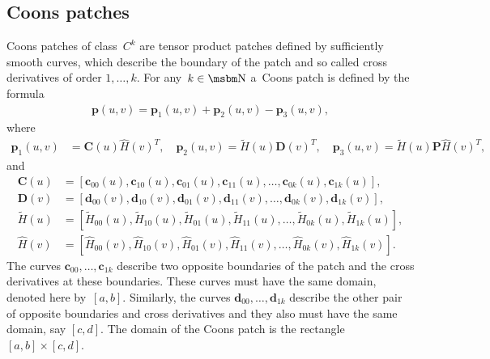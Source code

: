 \subsection{\label{ssect:Coons:patch:def}Coons patches}

Coons patches of class~$C^k$ are tensor product patches defined by
sufficiently smooth curves, which describe the boundary of the patch and
so called cross derivatives of order $1,\ldots,k$. For any~$k\in\N$ a~Coons
patch is defined by the formula
\begin{align}\label{eq:Coons:patch:def}
  \bm{p}(u,v) = \bm{p}_1(u,v)+\bm{p}_2(u,v)-\bm{p}_3(u,v),
\end{align}
where
\begin{align*}
  \bm{p}_1(u,v) &{}= \bm{C}(u)\hat{H}(v)^T, \quad
  \bm{p}_2(u,v) = \tilde{H}(u)\bm{D}(v)^T, \quad
  \bm{p}_3(u,v) = \tilde{H}(u)\bm{P}\hat{H}(v)^T,
\end{align*}
and
\begin{align*}
  \bm{C}(u) &{}= [\bm{c}_{00}(u),\bm{c}_{10}(u),\bm{c}_{01}(u),\bm{c}_{11}(u),
               \ldots,\bm{c}_{0k}(u),\bm{c}_{1k}(u)], \\
  \bm{D}(v) &{}= [\bm{d}_{00}(v),\bm{d}_{10}(v),\bm{d}_{01}(v),\bm{d}_{11}(v),
               \ldots,\bm{d}_{0k}(v),\bm{d}_{1k}(v)], \\
  \tilde{H}(u) &{}= [\tilde{H}_{00}(u),\tilde{H}_{10}(u),
                     \tilde{H}_{01}(u),\tilde{H}_{11}(u),\ldots,
                     \tilde{H}_{0k}(u),\tilde{H}_{1k}(u)], \\
  \hat{H}(v) &{}= [\hat{H}_{00}(v),\hat{H}_{10}(v),
                     \hat{H}_{01}(v),\hat{H}_{11}(v),\ldots,
                     \hat{H}_{0k}(v),\hat{H}_{1k}(v)].
\end{align*}
The curves $\bm{c}_{00},\ldots,\bm{c}_{1k}$ describe two opposite boundaries
of the patch and the cross derivatives at these boundaries. These curves
must have the same domain, denoted here by~$[a,b]$. Similarly, the curves
$\bm{d}_{00},\ldots,\bm{d}_{1k}$ describe the other pair of opposite
boundaries and cross derivatives and they also must have the same domain, say
$[c,d]$. The domain of the Coons patch is the rectangle $[a,b]\times[c,d]$.

